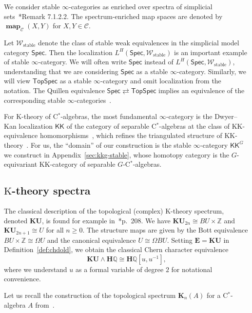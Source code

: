 \documentclass[a4paper,reqno]{amsart}
\theoremstyle{plain}
\theoremstyle{definition}
\theoremstyle{remark}
\numberwithin{equation}{section}
\newcommand{\rK}{\mathrm{K}}
\newcommand{\cC}{\mathcal{C}}
\newcommand{\cW}{\mathcal{W}}
\newcommand{\dQ}{\mathbb{Q}}
\newcommand{\dZ}{\mathbb{Z}}
\newcommand{\bE}{\mathbf{E}}
\newcommand{\bH}{\mathbf{H}}
\newcommand{\bK}{\mathbf{K}}
\newcommand{\Spec}{\mathsf{Spec}}
\newcommand{\TopSpec}{\mathsf{TopSpec}}
\newcommand{\KK}{\mathrm{KK}}
\newcommand{\icKK}{\mathsf{KK}}
\newcommand{\KU}{\mathbf{KU}}
\DeclareMathOperator{\map}{\mathbf{map}}
\begin{document}
We consider stable $\infty$-categories as enriched over spectra of simplicial sets~\cite{lur:ha}*{Remark 7.1.2.2}.
The spectrum-enriched map spaces are denoted by $\map_{\cC}(X, Y)$ for $X, Y \in \cC$.

Let $\cW_{\mathrm{stable}}$ denote the class of stable weak equivalences in the simplicial model category $\Spec$. Then the localization $L^H(\Spec,\cW_{\mathrm{stable}})$ is an important example of stable $\infty$-category. We will often write $\Spec$ instead of $L^H(\Spec,\cW_{\mathrm{stable}})$, understanding that we are considering $\Spec$ as a stable $\infty$-category. Similarly, we will view $\TopSpec$ as a stable $\infty$-category and omit localization from the notation. The Quillen equivalence $\Spec \rightleftarrows \TopSpec$ implies an equivalence of the corresponding stable $\infty$-categories~\cite{magee:quillen}.

For $\rK$-theory of C$^*$-algebras, the most fundamental $\infty$-category is the Dwyer--Kan localization $\icKK$ of the category of separable C$^*$-algebras at the class of $\KK$-equivalence homomorphisms~\cite{landnik:comp}, which refines the triangulated structure of $\KK$-theory~\cite{nestmeyer:loc}.
For us, the ``domain'' of our construction is the stable $\infty$-category $\icKK^G$ we construct in Appendix~\ref{sec:kkg-stable}, whose homotopy category is the $G$-equivariant $\KK$-category of separable $G$-C$^*$-algebras.

\subsection{\texorpdfstring{$\rK$}{K}-theory spectra}\label{subsec:kthspec}

The classical description of the topological (complex) $\rK$-theory spectrum, denoted $\KU$, is found for example in~\cite{may:concise}*{p.~208}. We have $\KU_{2n} \cong BU\times \dZ$ and $\KU_{2n+1} \cong U$ for all $n\geq 0$.
The structure maps are given by the Bott equivalence $BU\times \dZ\cong \Omega U$ and the canonical equivalence $U\cong \Omega BU$. 
Setting $\bE=\KU$ in Definition~\ref{def:chdold}, we obtain the classical Chern character equivalence
\begin{equation}\label{eq:chern-equiv}
\KU \wedge \bH\dQ \cong \bH\dQ[u,u^{-1}],
\end{equation}
where we understand $u$ as a formal variable of degree $2$ for notational convenience.

\medskip

Let us recall the construction of the topological spectrum $\bK_n(A)$ for a C$^*$-algebra $A$ from~\cite{dekm:spec}.
\end{document}

